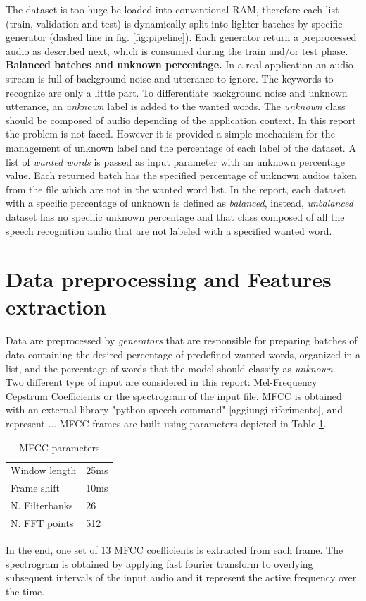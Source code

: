 The dataset is too huge be loaded into conventional RAM, therefore each list (train, validation and test) is dynamically split into lighter batches by specific generator (dashed line in fig. \ref{fig:pipeline}). Each generator return a preprocessed audio as described next, which is consumed during the train and/or test phase.\\
\textbf{Balanced batches and unknown percentage.} In a real application an audio stream is full of background noise and utterance to ignore. The keywords to recognize are only a little part. To differentiate background noise and unknown utterance, an \textit{unknown} label is added to the wanted words. The \textit{unknown} class should be composed of audio depending of the application context. In this report the problem is not faced. However it is provided a simple mechanism for the management of unknown label and the percentage of each label of the dataset. A list of \textit{wanted words} is passed as input parameter with an unknown percentage value. Each returned batch has the specified percentage of unknown audios taken from the file which are not in the wanted word list. In the report, each dataset with a specific percentage of unknown is defined as \textit{balanced}, instead, \textit{unbalanced} dataset has no specific unknown percentage and that class composed of all the speech recognition audio that are not labeled with a specified wanted word.


\section{Data preprocessing and Features extraction}
\label{sec:model}

\noindent Data are preprocessed by \textit{generators} that are responsible for preparing batches of data containing the desired percentage of predefined wanted words, organized in a list, and the percentage of words that the model should classify as \textit{unknown}. \\
Two different type of input are considered in this report: Mel-Frequency Cepstrum Coefficients or the spectrogram of the input file. MFCC is obtained with an external library "python speech command" [aggiungi riferimento], and represent ...  MFCC frames are built using parameters depicted in Table \ref{table:mfcc_parameters}.
\begin{table}[h!]
	\centering
	\begin{tabular}{ p{3cm}|p{3cm}|}
		\hline
		Window length & 25ms \\
		Frame shift  & 10ms  \\
		N. Filterbanks & 26\\
		N. FFT points & 512\\
		\hline
	\end{tabular}
	\caption{MFCC parameters}
	\label{table:mfcc_parameters}
\end{table}
\noindent In the end, one set of 13 MFCC coefficients is extracted from each frame. 
The spectrogram is obtained by applying fast fourier transform to overlying subsequent intervals of the input audio and it represent the active frequency over the time.


